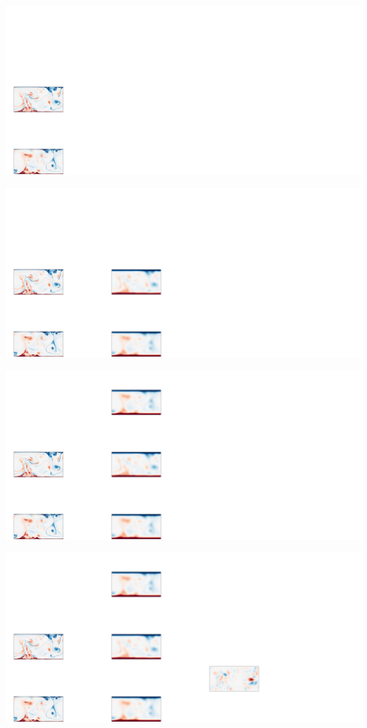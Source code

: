\documentclass[12pt, aspectratio=169]{beamer}
\begin{document}
\begin{frame}
    \centering
    \includegraphics[width=\linewidth]{figures/method2.pdf}
\end{frame}

\begin{frame}
    \centering
    \includegraphics[width=\linewidth]{figures/method3.pdf}
\end{frame}

\begin{frame}
    \centering
    \includegraphics[width=\linewidth]{figures/method4.pdf}
\end{frame}

\begin{frame}
    \centering
    \includegraphics[width=\linewidth]{figures/method5.pdf}
\end{frame}
\end{document}
